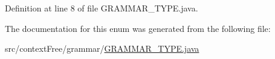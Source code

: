 Definition at line 8 of file G\-R\-A\-M\-M\-A\-R\-\_\-\-T\-Y\-P\-E.\-java.



The documentation for this enum was generated from the following file\-:\begin{DoxyCompactItemize}
\item 
src/context\-Free/grammar/\hyperlink{_g_r_a_m_m_a_r___t_y_p_e_8java}{G\-R\-A\-M\-M\-A\-R\-\_\-\-T\-Y\-P\-E.\-java}\end{DoxyCompactItemize}
